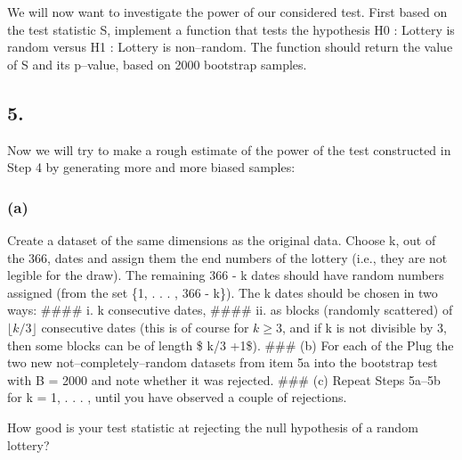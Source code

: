 \documentclass[
]{article}
\begin{document}
We will now want to investigate the power of our considered test. First
based on the test statistic S, implement a function that tests the
hypothesis H0 : Lottery is random versus H1 : Lottery is non--random.
The function should return the value of S and its p--value, based on
2000 bootstrap samples.

\hypertarget{section-4}{%
\subsection{5.}\label{section-4}}

Now we will try to make a rough estimate of the power of the test
constructed in Step 4 by generating more and more biased samples:

\hypertarget{a}{%
\subsubsection{(a)}\label{a}}

Create a dataset of the same dimensions as the original data. Choose k,
out of the 366, dates and assign them the end numbers of the lottery
(i.e., they are not legible for the draw). The remaining 366 - k dates
should have random numbers assigned (from the set \{1, . . . , 366 -
k\}). The k dates should be chosen in two ways: \#\#\#\# i. k
consecutive dates, \#\#\#\# ii. as blocks (randomly scattered) of
\(\lfloor k/3 \rfloor\) consecutive dates (this is of course for
\(k ≥ 3\), and if k is not divisible by 3, then some blocks can be of
length \$ \lfloor k/3 \rfloor +1\$). \#\#\# (b) For each of the Plug the
two new not--completely--random datasets from item 5a into the bootstrap
test with B = 2000 and note whether it was rejected. \#\#\# (c) Repeat
Steps 5a--5b for k = 1, . . . , until you have observed a couple of
rejections.

How good is your test statistic at rejecting the null hypothesis of a
random lottery?
\end{document}
